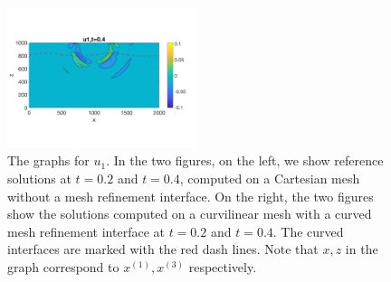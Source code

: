 \begin{figure}[htbp]
	\includegraphics[width=0.49\textwidth,trim={0 2.8cm 0 2.8cm}, clip]{u1_t04_curvi_mr.png}
\caption{The graphs for $u_1$. In the two figures, on the left, we show reference solutions at $t=0.2$ and $t=0.4$, computed on a Cartesian mesh without a mesh refinement interface. On the right, the two figures show the solutions computed on a curvilinear mesh with a curved mesh refinement interface at $t=0.2$ and $t=0.4$. The curved interfaces are marked with the red dash lines. Note that $x,z$ in the graph correspond to $x^{(1)}, x^{(3)}$ respectively.}
\label{u1}
\end{figure}


